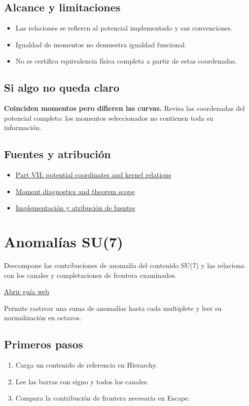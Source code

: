 \documentclass[11pt,a4paper]{article}
\begin{document}
\subsection*{Alcance y limitaciones}
\begin{itemize}
\item Las relaciones se refieren al potencial implementado y sus convenciones.
\item Igualdad de momentos no demuestra igualdad funcional.
\item No se certifica equivalencia física completa a partir de estas coordenadas.
\end{itemize}
\subsection*{Si algo no queda claro}
\textbf{Coinciden momentos pero difieren las curvas.} Revisa las coordenadas del potencial completo: los momentos seleccionados no contienen toda su información.

\subsection*{Fuentes y atribución}
\begin{itemize}
\item \href{https://karlesmarin.github.io/ghu-explorer/papers/part-vii/index.html}{Part VII: potential coordinates and kernel relations}
\item \href{https://karlesmarin.github.io/ghu-explorer/docs/su7-certification.html}{Moment diagnostics and theorem scope}
\item \href{https://github.com/karlesmarin/ghu-lab/blob/main/src/sections/samepot_section.js}{Implementación y atribución de fuentes}
\end{itemize}
\section{Anomalías SU(7)}
Descompone las contribuciones de anomalía del contenido SU(7) y las relaciona con los canales y completaciones de frontera examinados.

\href{https://karlesmarin.github.io/ghu-explorer/guide/es/anomalies/index.html}{Abrir guía web}

Permite rastrear una suma de anomalías hasta cada multiplete y leer su normalización en octavos.
\subsection*{Primeros pasos}
\begin{enumerate}
\item Carga un contenido de referencia en Hierarchy.
\item Lee las barras con signo y todos los canales.
\item Compara la contribución de frontera necesaria en Escape.
\end{enumerate}
\end{document}
